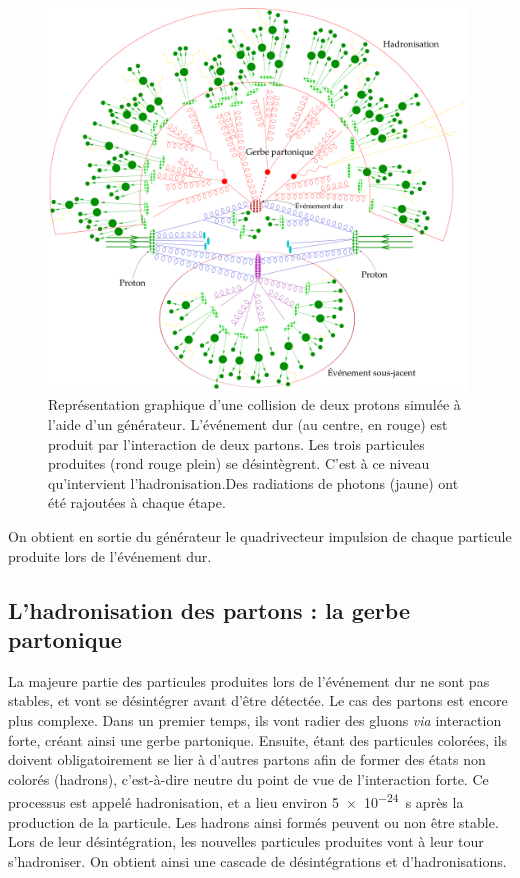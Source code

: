 \begin{figure}[htbp]
    \centering
    \includegraphics[width=0.99\textwidth]{chapitre3/figs/parton_shower_legend.pdf}
    \caption{Représentation graphique d'une collision de deux protons simulée à l'aide d'un générateur. L'événement dur (au centre, en rouge) est produit par l'interaction de deux partons. Les trois particules produites (rond rouge plein) se désintègrent. C'est à ce niveau qu'intervient l'hadronisation.Des radiations de photons (jaune) ont été rajoutées à chaque étape.}
    \label{fig:parton_shower}
\end{figure}

On obtient en sortie du générateur le quadrivecteur impulsion de chaque particule produite lors de l'événement dur.

\subsection{L'hadronisation des partons : la gerbe partonique}

La majeure partie des particules produites lors de l'événement dur ne sont pas stables, et vont se désintégrer avant d'être détectée. Le cas des partons est encore plus complexe. Dans un premier temps, ils vont radier des gluons \emph{via} interaction forte, créant ainsi une gerbe partonique. Ensuite, étant des particules colorées, ils doivent obligatoirement se lier à d'autres partons afin de former des états non colorés (hadrons), c'est-à-dire neutre du point de vue de l'interaction forte. Ce processus est appelé hadronisation, et a lieu environ \SI{5e-24}{\s} après la production de la particule. Les hadrons ainsi formés peuvent ou non être stable. Lors de leur désintégration, les nouvelles particules produites vont à leur tour s'hadroniser. On obtient ainsi une cascade de désintégrations et d'hadronisations.

